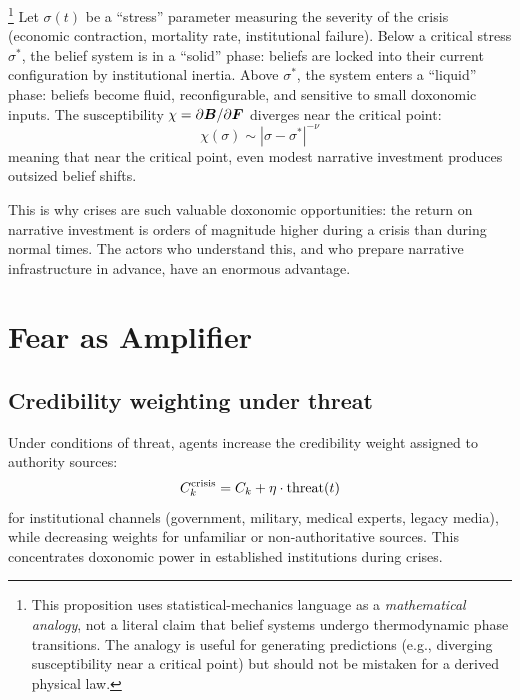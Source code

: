 \begin{proposition}\footnote{This proposition uses statistical-mechanics language as a \emph{mathematical analogy}, not a literal claim that belief systems undergo thermodynamic phase transitions. The analogy is useful for generating predictions (e.g., diverging susceptibility near a critical point) but should not be mistaken for a derived physical law.}
\label{prop:phase-transition}
Let $\sigma(t)$ be a ``stress'' parameter measuring the severity of the crisis (economic contraction, mortality rate, institutional failure).
Below a critical stress $\sigma^*$, the belief system is in a ``solid'' phase: beliefs are locked into their current configuration by institutional inertia.
Above $\sigma^*$, the system enters a ``liquid'' phase: beliefs become fluid, reconfigurable, and sensitive to small doxonomic inputs.
The susceptibility $\chi = \partial \bm{B} / \partial \bm{F}$ diverges near the critical point:
\[
  \chi(\sigma) \sim |\sigma - \sigma^*|^{-\nu}
\]
meaning that near the critical point, even modest narrative investment produces outsized belief shifts.
\end{proposition}

This is why crises are such valuable doxonomic opportunities: the return on narrative investment is orders of magnitude higher during a crisis than during normal times.
The actors who understand this, and who prepare narrative infrastructure in advance, have an enormous advantage.

\section{Fear as Amplifier}
\label{sec:ch29-fear}

\subsection{Credibility weighting under threat}

\begin{proposition}
\label{prop:fear}
Under conditions of threat, agents increase the credibility weight assigned to authority sources:
\[
  C_{k}^{\text{crisis}} = C_{k} + \eta \cdot \operatorname{threat}(t)
\]
for institutional channels (government, military, medical experts, legacy media), while decreasing weights for unfamiliar or non-authoritative sources.
This concentrates doxonomic power in established institutions during crises.
\end{proposition}

